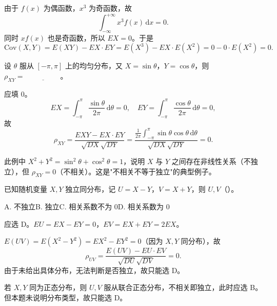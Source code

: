 ﻿\documentclass[lang=cn,11pt]{elegantbook}
\begin{document}
\begin{solution}
由于 \(f(x)\) 为偶函数，\(x^3\) 为奇函数，故
\[
\int_{-\infty}^{+\infty} x^3 f(x)\,\mathrm{d}x = 0.
\]
同时 \(xf(x)\) 也是奇函数，所以 \(EX=0\)。于是
\[
\mathrm{Cov}(X,Y) = E(XY) - EX \cdot EY = E(X^3) - EX \cdot E(X^2) = 0 - 0\cdot E(X^2) = 0.
\]
\end{solution}

\begin{exercise}\label{exer:4-12-sincos}
设 \(\theta\) 服从 \([-\pi,\pi]\) 上的均匀分布，又 \(X = \sin\theta\)，\(Y = \cos\theta\)，则 \(\rho_{XY} =\,\underline{\hspace{2cm}}\)。
\end{exercise}

\begin{solution}
应填 0。
\[
EX = \int_{-\pi}^{\pi} \frac{\sin\theta}{2\pi}\,\mathrm{d}\theta = 0,\quad
EY = \int_{-\pi}^{\pi} \frac{\cos\theta}{2\pi}\,\mathrm{d}\theta = 0,
\]
故
\[
\rho_{XY} = \frac{EXY - EX \cdot EY}{\sqrt{DX}\sqrt{DY}} = \frac{\frac{1}{2\pi}\int_{-\pi}^{\pi}\sin\theta\cos\theta\,\mathrm{d}\theta}{\sqrt{DX}\sqrt{DY}} = 0.
\]

\begin{note}
此例中 \(X^2 + Y^2 = \sin^2\theta + \cos^2\theta = 1\)，说明 \(X\) 与 \(Y\) 之间存在非线性关系（不独立），但 \(\rho_{XY} = 0\)（不相关）。这是"不相关不等于独立"的典型例子。
\end{note}
\end{solution}

\begin{exercise}\label{exer:4-18-iid}
已知随机变量 \(X, Y\) 独立同分布，记 \(U = X - Y\)，\(V = X + Y\)，则 \(U, V\)（\quad）。\par
A. 不独立\quad B. 独立\quad C. 相关系数不为 0\quad D. 相关系数为 0
\end{exercise}

\begin{solution}
应选 D。\(EU = EX - EY = 0\)，\(EV = EX + EY = 2EX\)。

\(E(UV) = E(X^2 - Y^2) = EX^2 - EY^2 = 0\)（因为 \(X, Y\) 同分布），故
\[
\rho_{UV} = \frac{E(UV) - EU \cdot EV}{\sqrt{DU}\sqrt{DV}} = 0.
\]
由于未给出具体分布，无法判断是否独立，故只能选 D。

\begin{note}
若 \(X, Y\) 同为正态分布，则 \(U, V\) 服从联合正态分布，不相关即独立，此时应选 B。但本题未说明分布类型，故只能选 D。
\end{note}
\end{solution}
\end{document}
